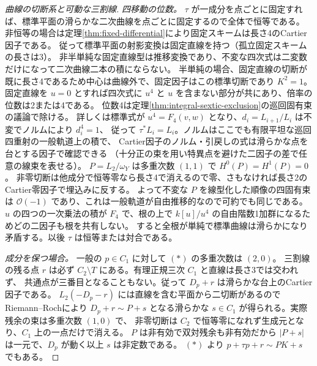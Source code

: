 \begin{proof}[曲線の切断系と可動な三割線]
\smallskip
\noindent\textit{四移動の位数。}
$\tau$ が一成分を点ごとに固定すれば、標準平面の滑らかな二次曲線を点ごとに固定するので全体で恒等である。
非恒等の場合は定理\ref{thm:fixed-differential}により固定スキームは長さ4のCartier因子である。
従って標準平面の射影変換は固定直線を持つ（孤立固定スキームの長さは3）。
非半単純な固定直線型は推移変換であり、不変な四次式は二変数だけになって二次曲線二本の積にならない。
半単純の場合、固定直線の切断が既に長さ4であるため中心は曲線外で、固定因子はこの標準切断であり $K^2=1$。
固定直線を $u=0$ とすれば四次式に $u^4$ と $u$ を含まない部分が共にあり、倍率の位数は2または4である。
位数4は定理\ref{thm:integral-sextic-exclusion}の巡回固有束の議論で除ける。
詳しくは標準式が $u^4=F_4(v,w)$ となり、$d_i=L_{i+1}/L_i$ は不変でノルムにより $d_i^4=1$、
従って $\tau^*L_i=L_i$。ノルムはここでも有限平坦な巡回四重射の一般軌道上の積で、
Cartier因子のノルム・引戻しの式は滑らかな点を台とする因子で確認できる
（十分正の束を用い特異点を避けた二因子の差で任意の線束を表せる）。
$P=L_2/\omega_Y$ は多重次数 $(1,1)$ で $H^0(P)=H^1(P)=0$。
非零切断は他成分で恒等零なら長さ4で消えるので零、さもなければ長さ2のCartier零因子で埋込みに反する。
よって不変な $P$ を線型化した順像の四固有束は $\mathcal O(-1)$ であり、これは一般軌道が自由推移的なので可約でも同じである。
$u$ の四つの一次乗法の積が $F_4$ で、根の上で $k[u]/u^4$ の自由階数1加群になるためどの二因子も根を共有しない。
すると全根が単純で標準曲線は滑らかになり矛盾する。以後 $\tau$ は恒等または対合である。

\smallskip
\noindent\textit{成分を保つ場合。}
一般の $p\in C_1$ に対して $(*)$ の多重次数は $(2,0)$。
三割線の残る点 $r$ は必ず $C_2\setminus T$ にある。有理正規三次 $C_1$ と直線は長さ3では交われず、
共通点が三番目となることもない。従って $D_p+r$ は滑らかな台上のCartier因子である。
$L_2(-D_p-r)$ には直線を含む平面から二切断があるのでRiemann--Rochにより
$D_p+r\sim P+s$ となる滑らかな $s\in C_1$ が得られる。実際残余の束は多重次数 $(1,0)$ で、
非零切断は $C_2$ で恒等零になれず生成元となり、$C_1$ 上の一点だけで消える。
$P$ は非有効で双対残余も非有効だから $|P+s|$ は一元で、$D_p$ が動く以上 $s$ は非定数である。
$(*)$ より $p+\tau p+r\sim PK+s$ でもある。


\end{proof}
